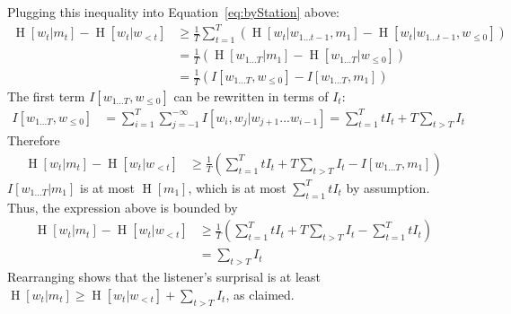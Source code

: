 \documentclass[11pt,letterpaper]{article}
\begin{document}
Plugging this inequality into Equation~\ref{eq:byStation} above:
\begin{align*}
\operatorname{H}[w_t | m_t] - \operatorname{H}[w_t | w_{<t}]& \geq \frac{1}{T} \sum_{t=1}^T ( \operatorname{H}[w_t|w_{1\dots t-1}, m_1] - \operatorname{H}[w_t | w_{1\dots t-1}, w_{\leq 0}]  )    \\
& = \frac{1}{T} \left(\operatorname{H}[w_{1\dots T} | m_1] - \operatorname{H}[w_{1\dots T} | w_{\leq 0}]\right)  \\
& = \frac{1}{T} \left(I[w_{1\dots T}, w_{\leq 0}] - I[w_{1\dots T}, m_1]\right) 
\end{align*}
The first term $I[w_{1\dots T}, w_{\leq 0}]$ can be rewritten in terms of $I_t$:
\begin{align*}
I[w_{1\dots T}, w_{\leq 0}] &= \sum_{i=1}^T \sum_{j=-1}^{-\infty} I[w_i, w_j | w_{j+1}...w_{i-1}] = \sum_{t=1}^T t I_t + T \sum_{t > T} I_t
\end{align*}
Therefore
\begin{align*}
\operatorname{H}[w_t | m_t] - \operatorname{H}[w_t | w_{<t}]& \geq \frac{1}{T} \left(\sum_{t=1}^T t I_t + T \sum_{t > T} I_t - I[w_{1\dots T}, m_1]\right) 
\end{align*}
$I[w_{1\dots T}|m_1]$ is at most $\operatorname{H}[m_1]$, which is at most $\sum_{t=1}^T t I_t$ by assumption. Thus, the expression above is bounded by
\begin{align*}
\operatorname{H}[w_t | m_t] - \operatorname{H}[w_t | w_{<t}]& \geq \frac{1}{T} \left(\sum_{t=1}^T t I_t + T \sum_{t > T} I_t - \sum_{t=1}^T t I_t\right) \\
&= \sum_{t > T} I_t
\end{align*}
Rearranging shows that the listener's surprisal is at least $\operatorname{H}[w_t|m_t] \geq \operatorname{H}[w_t | w_{<t}] + \sum_{t > T} I_t$, as claimed.
\end{document}
